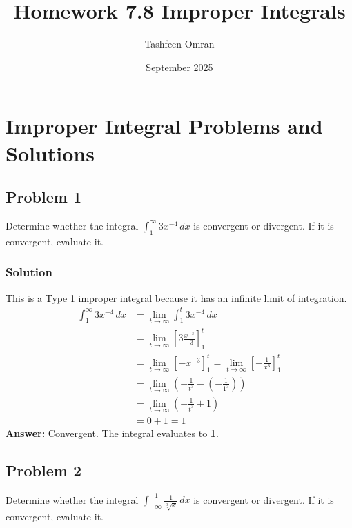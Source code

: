\documentclass{article}
\title{Homework 7.8 Improper Integrals}
\author{Tashfeen Omran}
\date{September 2025}
\begin{document}
\maketitle

\section{Improper Integral Problems and Solutions}

\subsection{Problem 1}
Determine whether the integral $ \int_{1}^{\infty} 3x^{-4} \,dx $ is convergent or divergent. If it is convergent, evaluate it.
\subsubsection*{Solution}
This is a Type 1 improper integral because it has an infinite limit of integration.
\begin{align*}
    \int_{1}^{\infty} 3x^{-4} \,dx &= \lim_{t \to \infty} \int_{1}^{t} 3x^{-4} \,dx \\
    &= \lim_{t \to \infty} \left[ 3 \frac{x^{-3}}{-3} \right]_{1}^{t} \\
    &= \lim_{t \to \infty} \left[ -x^{-3} \right]_{1}^{t} = \lim_{t \to \infty} \left[ -\frac{1}{x^3} \right]_{1}^{t} \\
    &= \lim_{t \to \infty} \left( -\frac{1}{t^3} - \left(-\frac{1}{1^3}\right) \right) \\
    &= \lim_{t \to \infty} \left( -\frac{1}{t^3} + 1 \right) \\
    &= 0 + 1 = 1
\end{align*}
\textbf{Answer:} Convergent. The integral evaluates to \textbf{1}.

\subsection{Problem 2}
Determine whether the integral $ \int_{-\infty}^{-1} \frac{1}{\sqrt[3]{x}} \,dx $ is convergent or divergent. If it is convergent, evaluate it.
\end{document}
